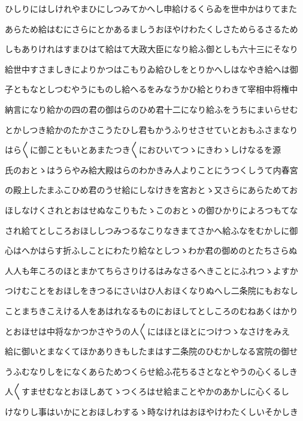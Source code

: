 \documentclass[a4paper,11pt,landscape]{ltjtarticle}
\begin{document}
\par\medskip
ひしりにはしけれやまひにしつみてかへし申給けるくらゐを世中かはりてまた
\par\medskip
あらため給はむにさらにとかあるましうおほやけわたくしさためらるさるため
\par\medskip
しもありけれはすまひはて給はて大政大臣になり給ふ御としも六十三にそなり
\par\medskip
給世中すさましきによりかつはこもりゐ給ひしをとりかへしはなやき給へは御
\par\medskip
子ともなとしつむやうにものし給へるをみなうかひ給とりわきて宰相中将権中
\par\medskip
納言になり給かの四の君の御はらのひめ君十二になり給ふをうちにまいらせむ
\par\medskip
とかしつき給かのたかさこうたひし君もかうふりせさせていとおもふさまなり
\par\medskip
はら〱に御こともいとあまたつき〱におひいてつゝにきわゝしけなるを源
\par\medskip
氏のおとゝはうらやみ給大殿はらのわかきみ人よりことにうつくしうて内春宮
\par\medskip
の殿上したまふこひめ君のうせ給にしなけきを宮おとゝ又さらにあらためてお
\par\medskip
ほしなけくされとおはせぬなこりもたゝこのおとゝの御ひかりによろつもてな
\par\medskip
され給てとしころおほししつみつるなこりなきまてさかへ給ふなをむかしに御
\par\medskip
心はへかはらす折ふしことにわたり給なとしつゝわか君の御めのとたちさらぬ
\par\medskip
人人も年ころのほとまかてちらさりけるはみなさるへきことにふれつゝよすか
\par\medskip
つけむことをおほしをきつるにさいはひ人おほくなりぬへし二条院にもおなし
\par\medskip
ことまちきこえける人をあはれなるものにおほしてとしころのむねあくはかり
\par\medskip
とおほせは中将なかつかさやうの人〱にはほとほとにつけつゝなさけをみえ
\par\medskip
給に御いとまなくてほかありきもしたまはす二条院のひむかしなる宮院の御せ
\par\medskip
うふむなりしをになくあらためつくらせ給ふ花ちるさとなとやうの心くるしき
\par\medskip
人〱すませむなとおほしあてゝつくろはせ給まことやかのあかしに心くるし
\par\medskip
けなりし事はいかにとおほしわするゝ時なけれはおほやけわたくしいそかしき
\par\medskip
\end{document}
